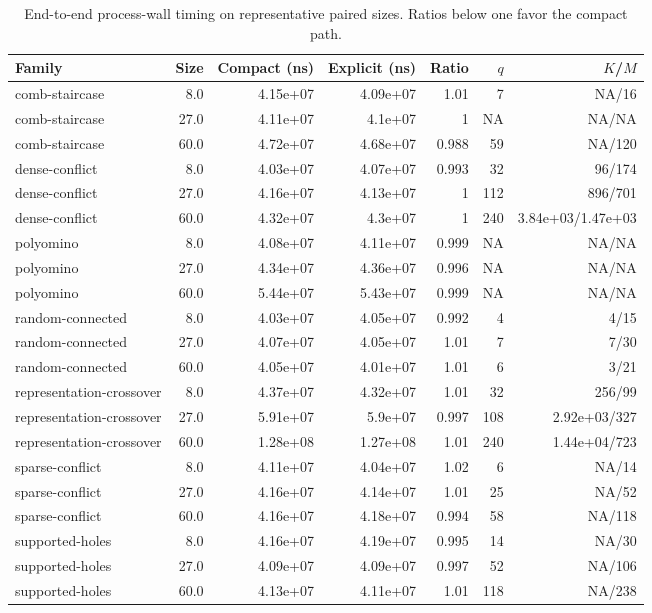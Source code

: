 \begin{table}[t]
\caption{End-to-end process-wall timing on representative paired sizes. Ratios below one favor the compact path.}
\label{tab:paper-scaling-timing}
\begin{tabular}{lrrrrrr}
\toprule
Family & Size & Compact (ns) & Explicit (ns) & Ratio & $q$ & $K$/$M$ \\
\midrule
comb-staircase & 8.0 & 4.15e+07 & 4.09e+07 & 1.01 & 7 & NA/16 \\
comb-staircase & 27.0 & 4.11e+07 & 4.1e+07 & 1 & NA & NA/NA \\
comb-staircase & 60.0 & 4.72e+07 & 4.68e+07 & 0.988 & 59 & NA/120 \\
dense-conflict & 8.0 & 4.03e+07 & 4.07e+07 & 0.993 & 32 & 96/174 \\
dense-conflict & 27.0 & 4.16e+07 & 4.13e+07 & 1 & 112 & 896/701 \\
dense-conflict & 60.0 & 4.32e+07 & 4.3e+07 & 1 & 240 & 3.84e+03/1.47e+03 \\
polyomino & 8.0 & 4.08e+07 & 4.11e+07 & 0.999 & NA & NA/NA \\
polyomino & 27.0 & 4.34e+07 & 4.36e+07 & 0.996 & NA & NA/NA \\
polyomino & 60.0 & 5.44e+07 & 5.43e+07 & 0.999 & NA & NA/NA \\
random-connected & 8.0 & 4.03e+07 & 4.05e+07 & 0.992 & 4 & 4/15 \\
random-connected & 27.0 & 4.07e+07 & 4.05e+07 & 1.01 & 7 & 7/30 \\
random-connected & 60.0 & 4.05e+07 & 4.01e+07 & 1.01 & 6 & 3/21 \\
representation-crossover & 8.0 & 4.37e+07 & 4.32e+07 & 1.01 & 32 & 256/99 \\
representation-crossover & 27.0 & 5.91e+07 & 5.9e+07 & 0.997 & 108 & 2.92e+03/327 \\
representation-crossover & 60.0 & 1.28e+08 & 1.27e+08 & 1.01 & 240 & 1.44e+04/723 \\
sparse-conflict & 8.0 & 4.11e+07 & 4.04e+07 & 1.02 & 6 & NA/14 \\
sparse-conflict & 27.0 & 4.16e+07 & 4.14e+07 & 1.01 & 25 & NA/52 \\
sparse-conflict & 60.0 & 4.16e+07 & 4.18e+07 & 0.994 & 58 & NA/118 \\
supported-holes & 8.0 & 4.16e+07 & 4.19e+07 & 0.995 & 14 & NA/30 \\
supported-holes & 27.0 & 4.09e+07 & 4.09e+07 & 0.997 & 52 & NA/106 \\
supported-holes & 60.0 & 4.13e+07 & 4.11e+07 & 1.01 & 118 & NA/238 \\
\bottomrule
\end{tabular}
\end{table}

